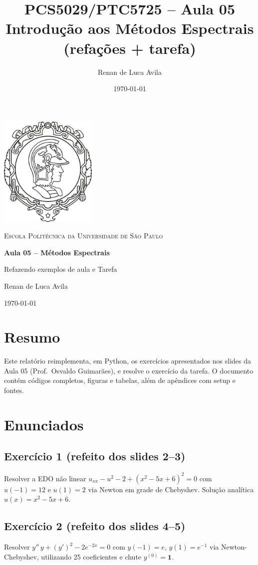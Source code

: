 \documentclass[12pt,a4paper]{article}
\title{PCS5029/PTC5725 -- Aula 05\\\large Introdução aos Métodos Espectrais (refações + tarefa)}
\author{Renan de Luca Avila}
\date{\today}
\begin{document}
\begin{titlepage}
\centering
\includegraphics[width=0.35\textwidth]{EP.jpg}\par\vspace{1cm}
{\scshape\LARGE Escola Politécnica da Universidade de São Paulo\par}
\vspace{1.5cm}
{\huge\bfseries Aula 05 -- Métodos Espectrais\par}
\vspace{0.5cm}
{\Large Refazendo exemplos de aula e Tarefa\par}
\vfill
{\large Renan de Luca Avila\par}
{\large \today\par}
\end{titlepage}

\tableofcontents
\newpage

\section*{Resumo}
Este relatório reimplementa, em Python, os exercícios apresentados nos slides da Aula 05 (Prof.\ Osvaldo Guimarães), e resolve o exercício da tarefa. O documento contém códigos completos, figuras e tabelas, além de apêndices com setup e fontes.

\section{Enunciados}
\subsection{Exercício 1 (refeito dos slides 2--3)}
Resolver a EDO não linear $u_{xx} - u^2 - 2 + (x^2-5x+6)^2 = 0$ com $u(-1)=12$ e $u(1)=2$ via Newton em grade de Chebyshev. Solução analítica $u(x)=x^2-5x+6$.
\subsection{Exercício 2 (refeito dos slides 4--5)}
Resolver $y''\,y + (y')^2 - 2e^{-2x}=0$ com $y(-1)=e$, $y(1)=e^{-1}$ via Newton-Chebyshev, utilizando 25 coeficientes e chute $y^{(0)}=\mathbf{1}$.
\end{document}
